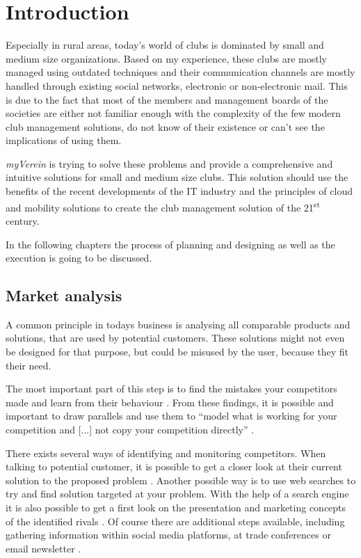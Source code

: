 \pagestyle{fancy}
\lhead{}
\renewcommand{\headrulewidth}{0pt}
\setlength{\headheight}{14pt}

\chapter{Introduction}

Especially in rural areas, today's world of clubs is dominated by small and medium size organizations. Based on my experience, these clubs are mostly managed using outdated techniques and their communication channels are mostly handled through existing social networks, electronic or non-electronic mail. This is due to the fact that most of the members and management boards of the societies are either not familiar enough with the complexity of the few modern club management solutions, do not know of their existence or can't see the implications of using them.

\emph{myVerein} is trying to solve these problems and provide a comprehensive and intuitive solutions for small and medium size clubs. This solution should use the benefits of the recent developments of the IT industry and the principles of cloud and mobility solutions to create the club management solution of the 21\textsuperscript{st} century. 

In the following chapters the process of planning and designing as well as the execution is going to be discussed. 

\section{Market analysis}
A common principle in todays business is analysing all comparable products and solutions, that are used by potential customers. These solutions might not even be designed for that purpose, but could be misused by the user, because they fit their need.

The most important part of this step is to find the mistakes your competitors made and learn from their behaviour \cite{Hunter:2015aa}. From these findings, it is possible and important to draw parallels and use them to \enquote{model what is working for your competition and [...] not copy your competition directly} \cite{Hunter:2015aa}. 

There exists several ways of identifying and monitoring competitors. When talking to potential customer, it is possible to get a closer look at their current solution to the proposed problem \cite{Philips:2015aa}. Another possible way is to use web searches to try and find solution targeted at your problem. With the help of a search engine it is also possible to get a first look on the presentation and marketing concepts of the identified rivals \cite{Philips:2015aa}. Of course there are additional steps available, including gathering information within social media platforms, at trade conferences or email newsletter \cite{Dahl:2011aa}. 

